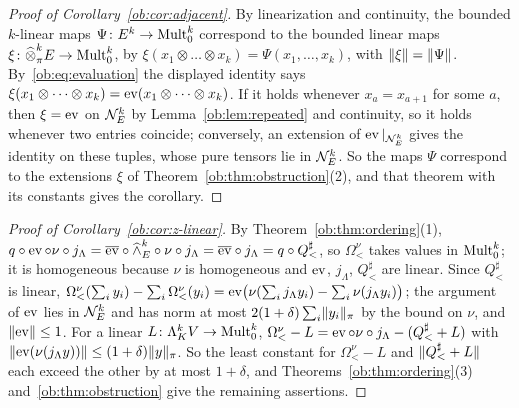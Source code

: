 \begin{proof}[Proof of Corollary~\ref{ob:cor:adjacent}]
By linearization and continuity, the bounded $k$-linear maps $\Psi\colon E^k\to\operatorname{Mult}^k_0$ correspond to the bounded linear
maps $\xi\colon\widehat\otimes^k_\pi E\to\operatorname{Mult}^k_0$, by $\xi(x_1\otimes\dots\otimes x_k)=\Psi(x_1,\dots,x_k)$, with
$\lVert \xi\rVert=\lVert \Psi\rVert$. By~\eqref{ob:eq:evaluation} the displayed identity says
$\xi(x_1\otimes\dots\otimes x_k)=\operatorname{ev}(x_1\otimes\dots\otimes x_k)$. If it holds whenever $x_a=x_{a+1}$ for some $a$, then
$\xi=\operatorname{ev}$ on $\mathcal N^k_E$ by Lemma~\ref{ob:lem:repeated} and continuity, so it holds whenever two entries coincide;
conversely, an extension of $\operatorname{ev}|_{\mathcal N^k_E}$ gives the identity on these tuples, whose pure tensors lie in $\mathcal N^k_E$. So the
maps $\Psi$ correspond to the extensions $\xi$ of Theorem~\ref{ob:thm:obstruction}(2), and that theorem with its constants
gives the corollary.
\end{proof}

\begin{proof}[Proof of Corollary~\ref{ob:cor:z-linear}]
By Theorem~\ref{ob:thm:ordering}(1),
$q\circ\operatorname{ev}\circ\nu\circ j_\Lambda=\overline{\operatorname{ev}}\circ\widehat\wedge^k_E\circ\nu\circ j_\Lambda=\overline{\operatorname{ev}}\circ j_\Lambda
=q\circ Q^\sharp_<$, so $\Omega^\nu_<$ takes values in $\operatorname{Mult}^k_0$; it is homogeneous because $\nu$ is homogeneous and $\operatorname{ev}$,
$j_\Lambda$, $Q^\sharp_<$ are linear. Since $Q^\sharp_<$ is linear,
$\Omega^\nu_<(\sum_iy_i)-\sum_i\Omega^\nu_<(y_i)=\operatorname{ev}\bigl(\nu(\sum_ij_\Lambda y_i)-\sum_i\nu(j_\Lambda y_i)\bigr)$; the argument
of $\operatorname{ev}$ lies in $\mathcal N^k_E$ and has norm at most $2(1+\delta)\sum_i\lVert y_i\rVert_\pi$ by the bound on $\nu$, and $\lVert \operatorname{ev}\rVert\le1$.
For a linear $L\colon\Lambda^k_KV\to\operatorname{Mult}^k_0$, $\Omega^\nu_<-L=\operatorname{ev}\circ\nu\circ j_\Lambda-(Q^\sharp_<+L)$ with
$\lVert \operatorname{ev}(\nu(j_\Lambda y))\rVert\le(1+\delta)\lVert y\rVert_\pi$. So the least constant for $\Omega^\nu_<-L$ and $\lVert Q^\sharp_<+L\rVert$
each exceed the other by at most $1+\delta$, and Theorems~\ref{ob:thm:ordering}(3) and~\ref{ob:thm:obstruction} give the
remaining assertions.
\end{proof}


